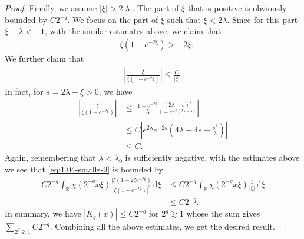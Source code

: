 \documentclass[../dissertation.tex]{subfiles}
\begin{document}
\begin{proof}
	Finally, we assume $|\xi| > 2 |\lambda|$. The part of $\xi$ that is positive is obviously
	bounded by $C2^{-q}$. We focus on the part of $\xi$ such that $\xi < 2 \lambda$. Since for 
	this part $\xi - \lambda < -1$, with the similar estimates above, we claim that
	\begin{align}
		-\zeta (1 - e^{-2\xi}) > -2 \xi.
	\end{align}
	We further claim that 
	\begin{align*}
		\left| \frac{\xi}{\zeta(1-e^{-2\xi})} \right|
			\leq \frac{C}{|\xi|}.
	\end{align*}
	In fact, for $s = 2 \lambda - \xi > 0$, we have
	\begin{align*}
		\left| \frac{\xi}{\zeta(1-e^{-2\xi})} \right|
			&\leq \left| 
					\frac{1-e^{-2\lambda}}{\lambda}
					\frac{(2\lambda-s)^2}{1 - e^{-2(2\lambda-s)}}
				\right| \\
			&\leq C \left|
					e^{2\lambda} e^{-2s} \left( 4\lambda - 4s + \frac{s^2}{\lambda} \right)
				\right| \\
			&\leq C.
	\end{align*}
	Again, remembering that $\lambda < \lambda_0$ is suf{}ficiently negative, 
	with the estimates
	above we see that \eqref{eq:1.04-smallz-9} is bounded by 
	\begin{align*}
		C 2^{-q} 
		\int_{\mathbb R} 
			\chi\left( 2^{-q} x \xi \right) 
			\frac{|\xi\left(1-2\zeta e^{-2\xi}\right)}{\left|\zeta\left(1-e^{-2\xi}\right)\right|^2}
		\, \mathrm{d}\xi
			&\leq C 2^{-q} 
				\int_{\mathbb R} 
					\chi\left( 2^{-q} x \xi \right) \frac{1}{|\xi|} 
				\, \mathrm{d}\xi \\
			&\leq C 2^{-q}.
	\end{align*}
	In summary, we have $|K_q(x)| \leq C 2^{-q}$ for $2^{q} \gtrsim 1$ whose
	the sum gives $\displaystyle \sum_{2^q \gtrsim 1} C 2^{-q}$. Combining
	all the above estimates, we get the desired result.
\end{proof}
\end{document}
